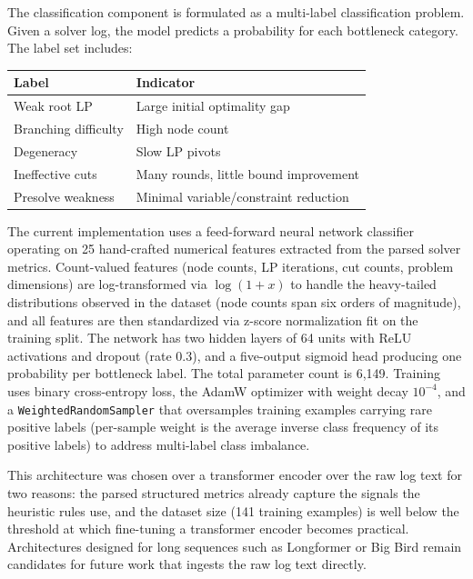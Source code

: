 \documentclass[11pt]{article}
\begin{document}
The classification component is formulated as a multi-label classification problem. Given a solver log, the model predicts a probability for each bottleneck category. 
The label set includes:

\begin{table}[h]
\centering
\begin{tabular}{ll}
\toprule
\textbf{Label} & \textbf{Indicator} \\
\midrule
Weak root LP & Large initial optimality gap \\
Branching difficulty & High node count \\
Degeneracy & Slow LP pivots \\
Ineffective cuts & Many rounds, little bound improvement \\
Presolve weakness & Minimal variable/constraint reduction \\
\bottomrule
\end{tabular}
\label{tab:labels}
\end{table}

The current implementation uses a feed-forward neural network classifier operating on 25 hand-crafted numerical features extracted from the parsed solver metrics. Count-valued features (node counts, LP iterations, cut counts, problem dimensions) are log-transformed via $\log(1+x)$ to handle the heavy-tailed distributions observed in the dataset (node counts span six orders of magnitude), and all features are then standardized via z-score normalization fit on the training split. The network has two hidden layers of 64 units with ReLU activations and dropout (rate 0.3), and a five-output sigmoid head producing one probability per bottleneck label. The total parameter count is 6{,}149. Training uses binary cross-entropy loss, the AdamW optimizer with weight decay $10^{-4}$, and a \texttt{WeightedRandomSampler} that oversamples training examples carrying rare positive labels (per-sample weight is the average inverse class frequency of its positive labels) to address multi-label class imbalance.

This architecture was chosen over a transformer encoder over the raw log text for two reasons: the parsed structured metrics already capture the signals the heuristic rules use, and the dataset size (141 training examples) is well below the threshold at which fine-tuning a transformer encoder becomes practical. Architectures designed for long sequences such as Longformer \cite{beltagy2020longformer} or Big Bird \cite{zaheer2020bigbird} remain candidates for future work that ingests the raw log text directly.
\end{document}
